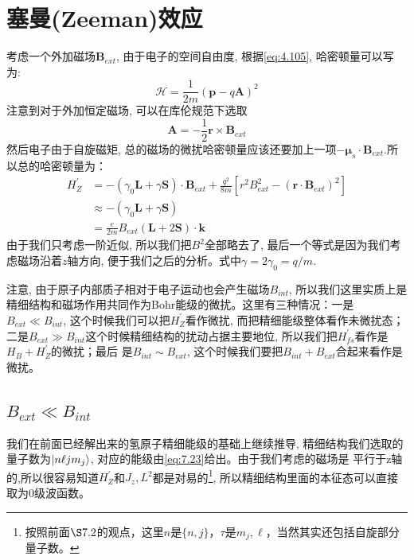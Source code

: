 \documentclass[a4paper,zihao=-4,linespread=1]{ctexrep}
\begin{document}
    \section{塞曼(Zeeman)效应}
    考虑一个外加磁场$\mathbf{B}_{ext}$, 由于电子的空间自由度, 根据\ref{eq:4.105}, 哈密顿量可以写为:
    \[\mathcal{H}=\frac{1}{2m}\left(\mathbf{p}-q\mathbf{A}\right)^2\]
    注意到对于外加恒定磁场, 可以在库伦规范下选取$$\mathbf{A}=-\frac{1}{2}\mathbf{r}\times\mathbf{B}_{ext}$$然后电子由于自旋磁矩, 总的磁场的微扰哈密顿量应该还要加上一项$-\mathbf{\mu}_s\cdot\mathbf{B}_{ext}$.所以总的哈密顿量为：
    \begin{align*}
        H_Z^\prime&=-\left(\gamma_0\mathbf{L}+\gamma\mathbf{S}\right)\cdot\mathbf{B}_{ext}+\frac{q^2}{8m}\left[r^2B_{ext}^2-\left(\mathbf{r}\cdot\mathbf{B}_{ext}\right)^2\right]\\
        &\approx -\left(\gamma_0\mathbf{L}+\gamma\mathbf{S}\right)\\
        &=\frac{e}{2m}B_{ext}\left(\mathbf{L}+2\mathbf{S}\right)\cdot\mathbf{k}
    \end{align*}
    由于我们只考虑一阶近似, 所以我们把$B^2$全部略去了, 最后一个等式是因为我们考虑磁场沿着$z$轴方向, 便于我们之后的分析。式中$\gamma=2\gamma_0=q/m$.

    注意, 由于原子内部质子相对于电子运动也会产生磁场$B_{int}$, 所以我们这里实质上是精细结构和磁场作用共同作为Bohr能级的微扰。这里有三种情况：一是$B_{ext}\ll B_{int}$, 
    这个时候我们可以把$H_Z^\prime$看作微扰, 而把精细能级整体看作未微扰态；二是$B_{ext}\gg B_{int}$这个时候精细结构的扰动占据主要地位, 所以我们把$H_{fs}^\prime$看作是$H_B+H_Z^\prime$的微扰；最后
    是$B_{int}\sim B_{ext}$, 这个时候我们要把$B_{int}+ B_{ext}$合起来看作是微扰。
    \subsection*{$B_{ext}\ll B_{int}$}
    我们在前面已经解出来的氢原子精细能级的基础上继续推导, 精细结构我们选取的量子数为$\ket{n\ell jm_j}$, 对应的能级由\ref{eq:7.23}给出。由于我们考虑的磁场是
    平行于z轴的,所以很容易知道$H_Z^\prime$和$J_z,L^2$都是对易的\footnote{按照前面$\S 7.2$的观点，这里$n$是$\{n,j\}$，$\tau$是$m_j,\ell$，当然其实还包括自旋部分量子数。}, 所以精细结构里面的本征态可以直接取为0级波函数。
\end{document}
